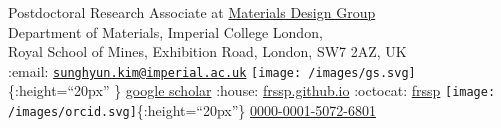 Postdoctoral Research Associate at
\href{https://wmd-group.github.io}{Materials Design Group}\\
Department of Materials, Imperial College London,\\
Royal School of Mines, Exhibition Road, London, SW7 2AZ, UK\\
:email:
\href{mailto:sunghyun.kim@imperial.ac.uk}{\nolinkurl{sunghyun.kim@imperial.ac.uk}}
\textbar{} \texttt{[image: /images/gs.svg]}\{:height=``20px'' \}
\href{https://scholar.google.co.uk/citations?user=v438vEAAAAAJ}{google
scholar} \textbar{} :house:
\href{https://frssp.github.io}{frssp.github.io} \textbar{} :octocat:
\href{https://github.com/frssp}{frssp} \textbar{}
\texttt{[image: /images/orcid.svg]}\{:height=``20px''\}
\href{https://orcid.org/0000-0001-5072-6801}{0000-0001-5072-6801}
